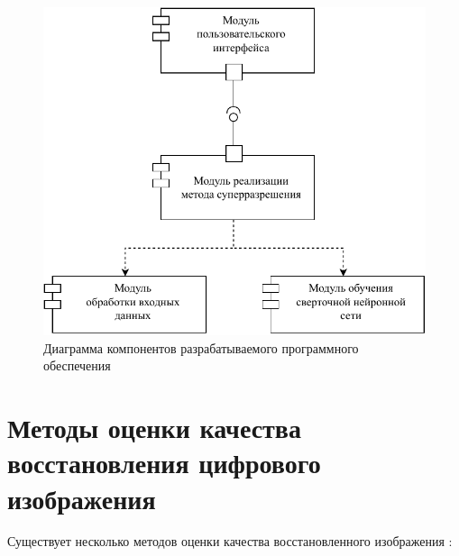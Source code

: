 \begin{figure}[H]
    \centering
    \includegraphics[scale=1]{assets/struct_po.pdf}
    \caption{Диаграмма компонентов разрабатываемого программного обеспечения}
    \label{struct-po}
\end{figure}

\section{Методы оценки качества восстановления цифрового изображения}

Существует несколько методов оценки качества восстановленного изображения \cite{metrics, metrics2}:


